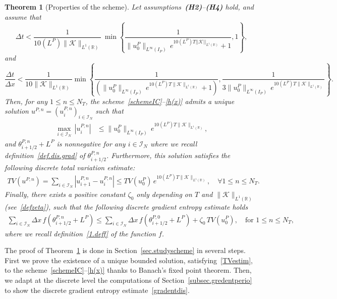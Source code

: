 \documentclass[11pt]{amsart}
\newtheorem{theorem}{Theorem}
\newcommand{\I}{\mathcal{I}_N}
\begin{document}
\begin{theorem}[Properties of the scheme]\label{thm.scheme}
Let assumptions~\textbf{\emph{(H2)}}--\textbf{\emph{(H4)}} hold, and assume that
\begin{equation}\label{delta t}
    \Delta t < \frac{1}{10 (L^P) \|\mathcal{K}\|_{L^1 (\mathbb{R})}}\,\min\left\{\frac{1}{\|u^P_0\|_{L^\infty(I_P)}\, e^{10 (L^P) T ||\mathcal{K}||_{L^1(\mathbb{R})}} + 1}, 1\right\},
\end{equation}
and
\begin{equation}\label{delta t over delta x}
   \frac{\Delta t}{\Delta x} < \frac{1}{10 \|\mathcal{K}\|_{L^1 (\mathbb{R})}}
    \min\left\{ 
\frac{1}{\left(\|u^P_0\|_{L^\infty(I_P)}\, e^{10 (L^P)T \|\mathcal{K}\|_{L^1(\mathbb{R})}} + 1\right)}, 
\frac{1}{3 \|u^P_0\|_{L^\infty(I_P)}\, e^{10 (L^P)T \|\mathcal{K}\|_{L^1(\mathbb{R})}}} 
    \right\}.
\end{equation}
Then, for any $1\leq n\leq N_T$, the scheme~\eqref{schemeIC}--\eqref{h(x)} admits a unique solution $u^{P,n} = (u^{P,n}_i)_{i\in\I}$ such that
\begin{align}\label{Linftybounddis}
 \max_{ i \in \I} \, |u_{i}^{P, n}| & \leq \|u^P_0\|_{L^\infty(I_P)} \, e^{10 (L^P) T \|\mathcal{K}\|_{L^1(\mathbb{R})}}, 
\end{align} 
and $\theta_{i + 1/2}^{P, n} + L^P$ is nonnegative for any $i\in\I$ where we recall definition~\eqref{def.dis.grad} of $\theta^{P,n}_{i+1/2}$. Furthermore, this solution satisfies the following discrete total variation estimate:
\begin{align}\label{TVestim}
 TV(u^{P, n} )= \sum_{i \in \I} \left| u^{P,n}_{i+1}-u^{P,n}_i\right| \leq TV(u^P_0 )\, e^{10 (L^P) T \|\mathcal{K}\|_{L^1(\mathbb{R})}}, \quad \forall 1\leq n \leq N_T.
 \end{align}
Finally, there exists a positive constant $\zeta_0$ only depending on $T$ and $\|\mathcal{K}\|_{L^1(\mathbb{R})}$ (see~\eqref{defzeta}), such that the following discrete gradient entropy estimate holds
 \begin{align}\label{gradentdis}
 \sum_{i \in\I} \Delta x \, f\left(\theta_{i + 1/2}^{P, n} + L^P\right) \leq \sum_{i \in \I} \Delta x \, f\left(\theta_{i + 1/2}^{P, 0}+ L^P\right) + \zeta_0 \, TV(u^P_0), \quad \mbox{for } 1\leq n \leq N_T,
\end{align}
where we recall definition~\eqref{1.deff} of the function $f$.
\end{theorem}

The proof of Theorem~\ref{thm.scheme} is done in Section~\ref{sec.studyscheme} in several steps. First we prove the existence of a unique bounded solution, satisfying~\eqref{TVestim}, to the scheme~\eqref{schemeIC}--\eqref{h(x)} thanks to Banach's fixed point theorem. Then, we adapt at the discrete level the computations of Section~\ref{subsec.gredentperio} to show the discrete gradient entropy estimate~\eqref{gradentdis}.
\end{document}
